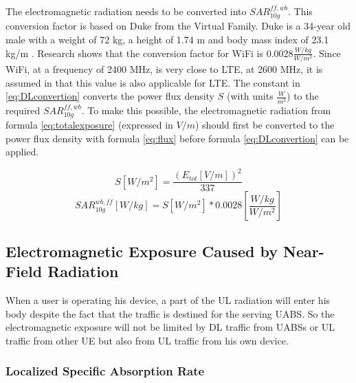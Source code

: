 The electromagnetic radiation needs to be converted into $SAR^{ff,wb}_{10g}$. 
This conversion factor is based on Duke from the Virtual Family. Duke is a 34-year old male with a weight of 72 kg, a height of 1.74 m and body
mass index of 23.1 kg/m \cite{J22_plets2015joint}. Research shows that the conversion factor for WiFi is $0.0028 \frac{W/kg}{W/m^2}$.
 Since WiFi, at a frequency of 2400 MHz,
is very close to LTE, at 2600 MHz, it is assumed in \cite{J22_plets2015joint} that this value is also applicable for \gls{LTE}.
The constant in \ref{eq:DLconvertion} converts the \gls{power flux density} $S$ (with units $\frac{W}{m^2}$) to the required $SAR^{ff,wb}_{10g}$.
To make this possible, the electromagnetic radiation
from formula \ref{eq:totalexposure} (expressed in  $V/m$) should first be converted to the  \gls{power flux density} with formula 
\ref{eq:flux} before formula \ref{eq:DLconvertion} can be applied.

\begin{equation}
S [W/m^2]= \frac{(E_{tot} [V/m])^2}{337}
\label{eq:flux}
\end{equation}
\begin{equation}
SAR^{wb,ff}_{10g} [W/kg]= S [W/m^2]* 0.0028  \left[\frac{W/kg}{W/m^2}\right]
\label{eq:DLconvertion}
\end{equation}

\subsection{Electromagnetic Exposure Caused by Near-Field Radiation}
\label{sub:Uplinkexposure}
When a user is operating his device, a part of the \gls{UL} radiation will enter his body despite the fact that the 
 traffic is destined for the serving \gls{UABS}. So the 
 electromagnetic exposure will not be limited by \gls{DL} traffic from \gls{UABS}s or \gls{UL} traffic 
from other \gls{UE} but also from \gls{UL} traffic from his own device.

\subsubsection{Localized Specific Absorption Rate}

